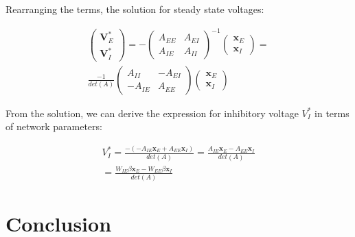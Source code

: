 \documentclass[10pt,twocolumn]{article}
\begin{document}
Rearranging the terms, the solution for steady state voltages:

$$
    \begin{align*}
        \begin{pmatrix}
            \textbf{V}^\ast_E \\ \textbf{V}^\ast_I
        \end{pmatrix}
        =
        -\begin{pmatrix}
             A_{EE} & A_{EI} \\
             A_{IE} & A_{II}
         \end{pmatrix}^{-1}
        \begin{pmatrix}
            \textbf{x}_E \\ \textbf{x}_I
        \end{pmatrix}
        =
        \\
        \frac{-1}{det(A)}
        \begin{pmatrix}
            A_{II}  & -A_{EI} \\
            -A_{IE} & A_{EE}
        \end{pmatrix}
        \begin{pmatrix}
            \textbf{x}_E \\ \textbf{x}_I
        \end{pmatrix}
    \end{align*}
$$

From the solution, we can derive the expression for
inhibitory voltage $V^\ast_I$ in terms of network parameters:

$$
    \begin{align*}
        V^\ast_I
        = \frac{-(- A_{IE}\textbf{x}_E + A_{EE}\textbf{x}_I)}{det(A)}
        = \frac{A_{IE}\textbf{x}_E - A_{EE}\textbf{x}_I}{det(A)}
        \\
        = \frac{W_{IE}\beta \textbf{x}_E - W_{EE}\beta \textbf{x}_I}{det(A)}
    \end{align*}
$$





\section{Conclusion}

\pagebreak
\pagebreak

\printbibliography
\end{document}
